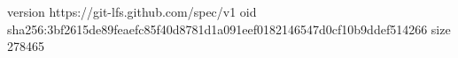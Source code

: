 version https://git-lfs.github.com/spec/v1
oid sha256:3bf2615de89feaefc85f40d8781d1a091eef0182146547d0cf10b9ddef514266
size 278465
